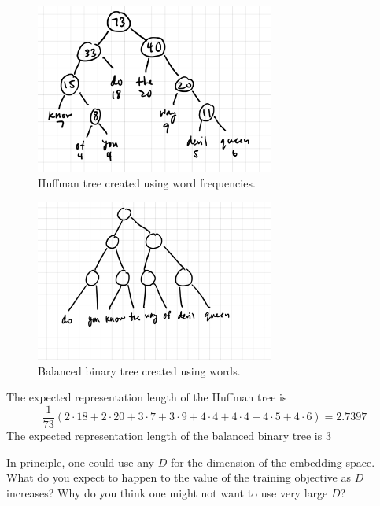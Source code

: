 \begin{solution}
    \begin{figure}[H]
    \begin{center}
        \includegraphics[width=0.7\textwidth]{plots/3b_huffman.jpeg}
        \caption{Huffman tree created using word frequencies.}
    \end{center}
    \end{figure}

    \begin{figure}[H]
    \begin{center}
        \includegraphics[width=0.7\textwidth]{plots/3b_bbt.jpeg}
        \caption{Balanced binary tree created using words.}
    \end{center}
    \end{figure}
    The expected representation length of the Huffman tree is
    \[
        \frac{1}{73}(2 \cdot 18 + 2 \cdot 20 + 3 \cdot 7 + 3 \cdot 9 + 4 \cdot 4 + 4 \cdot 4 + 4 \cdot 5 + 4 \cdot 6) = \boxed{2.7397}
    \]
    The expected representation length of the balanced binary tree is 3
\end{solution}


\problem[3]
In principle, one could use any $D$ for the dimension of the embedding space.  What do you expect to happen to the value of the training objective as $D$ increases?  Why do you think one might not want to use very large $D$?

